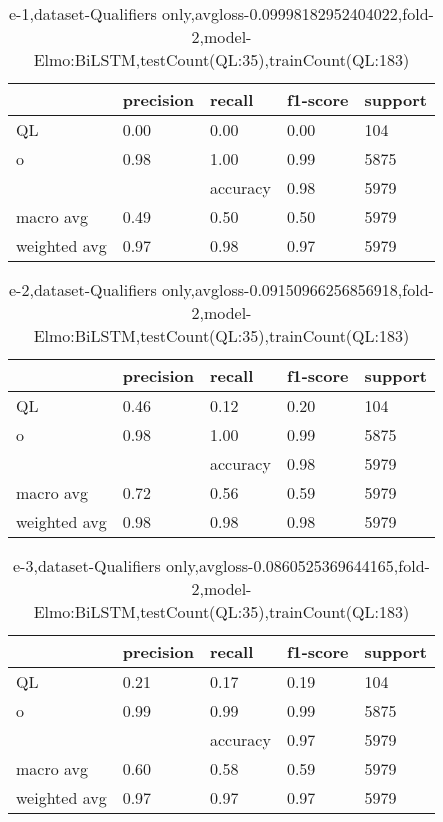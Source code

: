 \begin{table}[!ht] 
\centering
\caption{e-1,dataset-Qualifiers only,avgloss-0.09998182952404022,fold-2,model-Elmo:BiLSTM,testCount(QL:35),trainCount(QL:183)}\label{e-1data-qualS.tsv}
\begin{tabularx}{300pt}{|X|X|X|X|X|}
\hline
&precision&recall&f1-score&support\\
\hline
QL&0.00&0.00&0.00&104\\
\hline
o&0.98&1.00&0.99&5875\\
\hline
&&accuracy&0.98&5979\\
\hline
macro avg&0.49&0.50&0.50&5979\\
\hline
weighted avg&0.97&0.98&0.97&5979\\
\hline
\end{tabularx}
\end{table}
\begin{table}[!ht] 
\centering
\caption{e-2,dataset-Qualifiers only,avgloss-0.09150966256856918,fold-2,model-Elmo:BiLSTM,testCount(QL:35),trainCount(QL:183)}\label{e-2data-qualS.tsv}
\begin{tabularx}{300pt}{|X|X|X|X|X|}
\hline
&precision&recall&f1-score&support\\
\hline
QL&0.46&0.12&0.20&104\\
\hline
o&0.98&1.00&0.99&5875\\
\hline
&&accuracy&0.98&5979\\
\hline
macro avg&0.72&0.56&0.59&5979\\
\hline
weighted avg&0.98&0.98&0.98&5979\\
\hline
\end{tabularx}
\end{table}
\begin{table}[!ht] 
\centering
\caption{e-3,dataset-Qualifiers only,avgloss-0.0860525369644165,fold-2,model-Elmo:BiLSTM,testCount(QL:35),trainCount(QL:183)}\label{e-3data-qualS.tsv}
\begin{tabularx}{300pt}{|X|X|X|X|X|}
\hline
&precision&recall&f1-score&support\\
\hline
QL&0.21&0.17&0.19&104\\
\hline
o&0.99&0.99&0.99&5875\\
\hline
&&accuracy&0.97&5979\\
\hline
macro avg&0.60&0.58&0.59&5979\\
\hline
weighted avg&0.97&0.97&0.97&5979\\
\hline
\end{tabularx}
\end{table}
